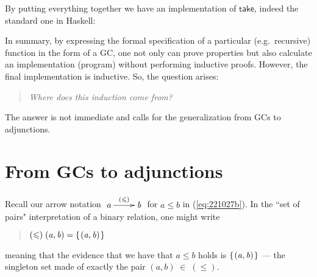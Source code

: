 \documentclass{elsarticle}
\makeatletter
\newcommand{\Varid}[1]{\mathit{#1}}
\newcommand{\anonymous}{\kern0.06em \vbox{\hrule\@width.5em}}
\renewcommand{\leq}{\leqslant}
\def\resethooks{%
  \global\let\SaveRestoreHook\empty
  \global\let\ColumnHook\empty}
\let\hspre\empty
\let\hspost\empty
\def\rarrow#1#2#3{\xymatrix{ #1 \ar[r]^-{#2} & #3 }}
\makeatother
\begin{document}
By putting everything together we have an implementation of \ensuremath{\mathsf{take}}, indeed
the standard one in Haskell:
\resethooks

In summary, by expressing the formal specification of a particular (e.g.\ recursive) function
in the form of a GC, one not only can prove properties but also calculate
an implementation (program) without performing inductive proofs.
However, the final implementation is inductive. So, the question arises:
\begin{quote}
	\emph{Where does this induction come from?}
\end{quote}
The answer is not immediate and calls for the generalization from GCs to adjunctions.

\section{From GCs to adjunctions} \label{sec:230302a}
Recall our arrow notation \ensuremath{\rarrow{\Varid{a}}{(\leq )}{\Varid{b}}} for \ensuremath{\Varid{a}\leq \Varid{b}} in  (\ref{eq:221027b}).
In the ``set of pairs" interpretation of a binary relation, one might write
\begin{quote}
\ensuremath{(\leq )\;(\Varid{a},\Varid{b})\mathrel{=}\{\mskip1.5mu (\Varid{a},\Varid{b})\mskip1.5mu\}}
\end{quote}
meaning that the evidence that we have that \ensuremath{\Varid{a}\leq \Varid{b}} holds is \ensuremath{\{\mskip1.5mu (\Varid{a},\Varid{b})\mskip1.5mu\}} --- the singleton set made of exactly the pair \ensuremath{(\Varid{a},\Varid{b})\;\mathbin\in \;(\leq )}.
\end{document}
